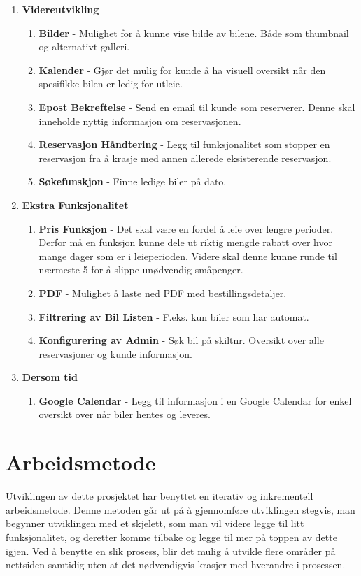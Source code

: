 \begin{enumerate}
  \item \textbf{Videreutvikling}
  \begin{enumerate} 
  	\item \textbf{Bilder} - Mulighet for å kunne vise bilde av bilene. Både som thumbnail og alternativt galleri.
	\item \textbf{Kalender} - Gjør det mulig for kunde å ha visuell oversikt når den spesifikke bilen er ledig for utleie. 
	\item \textbf{Epost Bekreftelse} - Send en email til kunde som reserverer. Denne skal inneholde nyttig informasjon om reservasjonen.
	\item \textbf{Reservasjon Håndtering} - Legg til funksjonalitet som stopper en reservasjon fra å krasje med annen allerede eksisterende reservasjon.
	\item \textbf{Søkefunskjon} - Finne ledige biler på dato.
  \end{enumerate}
  \newpage
  \item \textbf{Ekstra Funksjonalitet}
	\begin{enumerate}
		\item \textbf{Pris Funksjon} - Det skal være en fordel å leie over lengre perioder. Derfor må en funksjon kunne dele ut riktig mengde rabatt over hvor mange dager som er i leieperioden. Videre skal denne kunne runde til nærmeste 5 for å slippe unødvendig småpenger.
		\item \textbf{PDF} - Mulighet å laste ned PDF med bestillingsdetaljer.
		\item \textbf{Filtrering av Bil Listen} - F.eks. kun biler som har automat. 
		\item \textbf{Konfigurering av Admin} - Søk bil på skiltnr. Oversikt over alle reservasjoner og kunde informasjon.
	\end{enumerate}
  \item \textbf{Dersom tid}
  	\begin{enumerate}
  	\item \textbf{Google Calendar} - Legg til informasjon i en Google Calendar for enkel oversikt over når biler hentes og leveres.
  	\end{enumerate}
 
 \end{enumerate}
 
 
\section{Arbeidsmetode} \label{chap:method}
Utviklingen av dette prosjektet har benyttet en iterativ og inkrementell arbeidsmetode. Denne metoden går ut på å gjennomføre utviklingen stegvis, man begynner utviklingen med et skjelett, som man vil videre legge til litt funksjonalitet, og deretter komme tilbake og legge til mer på toppen av dette igjen. Ved å benytte en slik prosess, blir det mulig å utvikle flere områder på nettsiden samtidig uten at det nødvendigvis krasjer med hverandre i prosessen.


